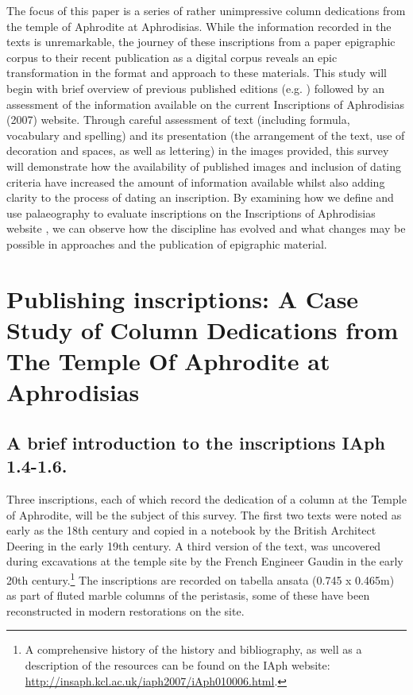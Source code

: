\documentclass[amsthm,ebook]{saparticle}
\begin{document}
\noindent The focus of this paper is a series of rather unimpressive column dedications from the temple of Aphrodite at
Aphrodisias. While the information recorded in the texts is unremarkable, the journey of these inscriptions from a paper epigraphic corpus to their recent publication as a digital corpus reveals an epic transformation in the
format and approach to these materials. This study will begin with brief overview of previous published editions
(e.g. \citet{calder1962}) followed by an assessment of the information available on the current Inscriptions of
Aphrodisias (2007) website. Through careful assessment of text (including formula, vocabulary and spelling) and its
presentation (the arrangement of the text, use of decoration and spaces, as well as lettering) in the images provided,
this survey will demonstrate how the availability of published images and inclusion of dating criteria have increased
the amount of information available whilst also adding clarity to the process of dating an inscription. By examining
how we define and use palaeography to evaluate inscriptions on the Inscriptions of Aphrodisias website \citep{ReynoldsRouecheBodard2007}, we
can observe how the discipline has evolved and what changes may be possible in approaches and the publication of
epigraphic material. 

%


\section{Publishing inscriptions: A Case Study of Column Dedications from The Temple Of Aphrodite at Aphrodisias}

\subsection{A brief introduction to the inscriptions IAph 1.4-1.6.}


\noindent Three inscriptions, each of which record the dedication of a column at the Temple of Aphrodite, will be the subject of
this survey. The first two texts were noted as early as the 18th century and copied in a notebook by the British
Architect Deering in the early 19th century. A third version of the text, was uncovered during excavations at the
temple site by the French Engineer Gaudin in the early 20th century.\footnote{ A comprehensive history of the history
and bibliography, as well as a description of the resources can be found on the IAph website:
\url{http://insaph.kcl.ac.uk/iaph2007/iAph010006.html}. } The inscriptions are recorded on tabella ansata (0.745 x 0.465m) as
part of fluted marble columns of the peristasis, some of these have been reconstructed in modern restorations on the
site. 
\end{document}
